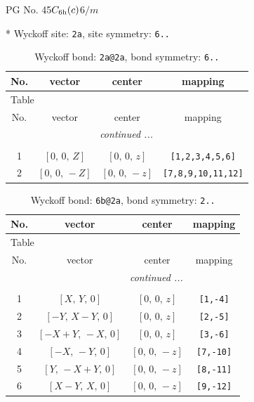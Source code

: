 \documentclass[fleqn,8pt]{jsarticle}
\begin{document}
\setcounter{MaxMatrixCols}{32}

\renewcommand{\tablename}{Table~}
\renewcommand{\figurename}{Figure~}
\begin{center}
\LARGE
PG No. 45\quad$C_{\rm 6h}(c)$\quad$6/m$\quad[ hexagonal ]
\end{center}


* Wyckoff site: {\tt 2a}, site symmetry: {\tt 6..}
\renewcommand{\arraystretch}{1.2}
\begin{longtable}{cccc}
\caption{Wyckoff bond: {\tt 2a@2a}, bond symmetry: {\tt 6..}}
 \\
 \hline \hline
No. & vector & center & mapping \\ \hline \endfirsthead

\multicolumn{3}{l}{\tablename\ \thetable{}} \\
 \hline \hline
No. & vector & center & mapping \\ \hline \endhead

 \hline \hline
\multicolumn{3}{r}{\footnotesize\it continued ...} \\ \endfoot

 \hline \hline
\multicolumn{3}{r}{} \\ \endlastfoot

1 & $\left[ 0,\, 0,\, Z \right]$ & $\left[ 0,\, 0,\, z \right]$ & {\tt [1,2,3,4,5,6]} \\ \hline
2 & $\left[ 0,\, 0,\, - Z \right]$ & $\left[ 0,\, 0,\, - z \right]$ & {\tt [7,8,9,10,11,12]} \\
\end{longtable}
\renewcommand{\arraystretch}{1.2}
\begin{longtable}{cccc}
\caption{Wyckoff bond: {\tt 6b@2a}, bond symmetry: {\tt 2..}}
 \\
 \hline \hline
No. & vector & center & mapping \\ \hline \endfirsthead

\multicolumn{3}{l}{\tablename\ \thetable{}} \\
 \hline \hline
No. & vector & center & mapping \\ \hline \endhead

 \hline \hline
\multicolumn{3}{r}{\footnotesize\it continued ...} \\ \endfoot

 \hline \hline
\multicolumn{3}{r}{} \\ \endlastfoot

1 & $\left[ X,\, Y,\, 0 \right]$ & $\left[ 0,\, 0,\, z \right]$ & {\tt [1,-4]} \\ \hline
2 & $\left[ - Y,\, X - Y,\, 0 \right]$ & $\left[ 0,\, 0,\, z \right]$ & {\tt [2,-5]} \\ \hline
3 & $\left[ - X + Y,\, - X,\, 0 \right]$ & $\left[ 0,\, 0,\, z \right]$ & {\tt [3,-6]} \\ \hline
4 & $\left[ - X,\, - Y,\, 0 \right]$ & $\left[ 0,\, 0,\, - z \right]$ & {\tt [7,-10]} \\ \hline
5 & $\left[ Y,\, - X + Y,\, 0 \right]$ & $\left[ 0,\, 0,\, - z \right]$ & {\tt [8,-11]} \\ \hline
6 & $\left[ X - Y,\, X,\, 0 \right]$ & $\left[ 0,\, 0,\, - z \right]$ & {\tt [9,-12]} \\
\end{longtable}
\end{document}
